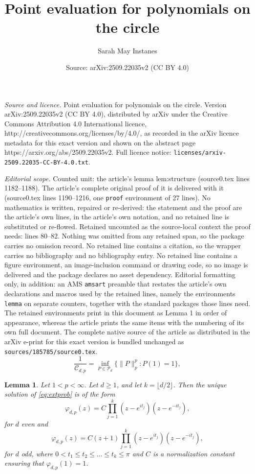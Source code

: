 \documentclass[10pt,a4paper]{amsart}
\title{Point evaluation for polynomials on the circle}
\author{Sarah May Instanes}
\date{Source: arXiv:2509.22035v2 (CC BY 4.0)}
\newtheorem{lemma}{Lemma}
\begin{document}
\maketitle

\noindent\emph{Source and licence.} Point evaluation for polynomials on the circle. Version arXiv:2509.22035v2 (CC BY 4.0), distributed by arXiv under the Creative Commons Attribution 4.0 International licence, http://creativecommons.org/licenses/by/4.0/, as recorded in the arXiv licence metadata for this exact version and shown on the abstract page https://arxiv.org/abs/2509.22035v2. Full licence notice: \texttt{licenses/arxiv-2509.22035-CC-BY-4.0.txt}.\par\smallskip

\noindent\textit{Editorial scope.} Counted unit: the article's lemma lem:structure (source0.tex lines 1182--1188). The article's complete original proof of it is delivered with it (source0.tex lines 1190--1216, one \texttt{proof} environment of 27 lines). No mathematics is written, repaired or re-derived: the statement and the proof are the article's own lines, in the article's own notation, and no retained line is substituted or re-flowed.  Retained uncounted as the source-local context the proof needs: lines 80--82.  Nothing was omitted from any retained span, so the package carries no omission record.  No retained line contains a citation, so the wrapper carries no bibliography and no bibliography entry.  No retained line contains a figure environment, an image-inclusion command or drawing code, so no image is delivered and the package declares no asset dependency.  Editorial formatting only, in addition: an AMS \texttt{amsart} preamble that restates the article's own declarations and macros used by the retained lines, namely the environments \texttt{lemma} on separate counters, together with the standard packages those lines need.  The retained environments print in this document as Lemma 1 in order of appearance, whereas the article prints the same items with the numbering of its own full document.  The complete native source of the article as distributed in the arXiv e-print for this exact version is bundled unchanged as \texttt{sources/185785/source0.tex}.
	\begin{equation}\label{eq:extprob}
		\frac{1}{\mathscr{C}_{d,p}} = \inf_{P \in \mathscr{P}_d} \{ \|P\|_p^p : P(1)=1\},
	\end{equation}

	\begin{lemma}\label{lem:structure}
		Let $1<p<\infty$. Let $d \geq 1$, and let $k=\lfloor d/2 \rfloor$. Then the unique solution of \eqref{eq:extprob} is of the form
		\[\varphi_{d, p}(z)= C\prod_{j=1}^{k} (z-e^{i t_j})(z-e^{-i t_j}),\]
		for $d$ even and 
		\[\varphi_{d, p}(z)=C(z+1) \prod_{j=1}^{k} (z-e^{i t_j})(z-e^{-i t_j}),\]
		for $d$ odd, where $0 < t_1 \leq t_2 \leq \dots \leq t_{k} \leq \pi$ and $C$ is a normalization constant ensuring that $\varphi_{d,p}(1)=1$.
	\end{lemma}
\end{document}

